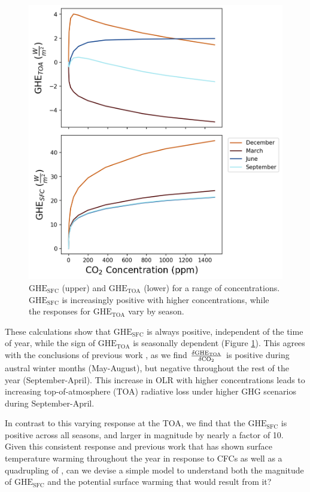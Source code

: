 \documentclass[draft]{agujournal2019}
\begin{document}
\begin{figure}[htb!]
\noindent\includegraphics[width=1\textwidth]{figures/GH_sfc_CO2_effect.png}
\centering
\caption{$\text{GHE}_{\text{SFC}}$ (upper) and $\text{GHE}_{\text{TOA}}$ (lower) for a range of  concentrations. $\text{GHE}_{\text{SFC}}$ is increasingly positive with higher  concentrations, while the responses for $\text{GHE}_{\text{TOA}}$ vary by season.}
\label{fig:sfc_toa_GHE}
\end{figure}

These calculations show that ${\text{GHE}_\text{{SFC}}}$ is always positive, independent of the time of year, while the sign of ${\text{GHE}_\text{{TOA}}}$ is seasonally dependent (Figure \ref{fig:sfc_toa_GHE}). This agrees with the conclusions of previous work  \cite{schmithusen_how_2015}, as we find $\frac{\delta{\text{GHE}_\text{{TOA}}}}{\delta\ce{CO_2}}$ is positive during austral winter months (May-August), but negative throughout the rest of the year (September-April). This increase in OLR with higher  concentrations leads to increasing top-of-atmosphere (TOA) radiative loss under higher GHG scenarios during September-April. 

In contrast to this varying response at the TOA, we find that the ${\text{GHE}_\text{{SFC}}}$ is positive across all seasons, and larger in magnitude by nearly a factor of 10. Given this consistent response and previous work that has shown surface temperature warming throughout the year in response to CFCs \cite{flanner_climate_2018} as well as a quadrupling of  \cite{smith_no_2018}, can we devise a simple model to understand both the magnitude of ${\text{GHE}_\text{{SFC}}}$ and the potential surface warming that would result from it? 
\end{document}
